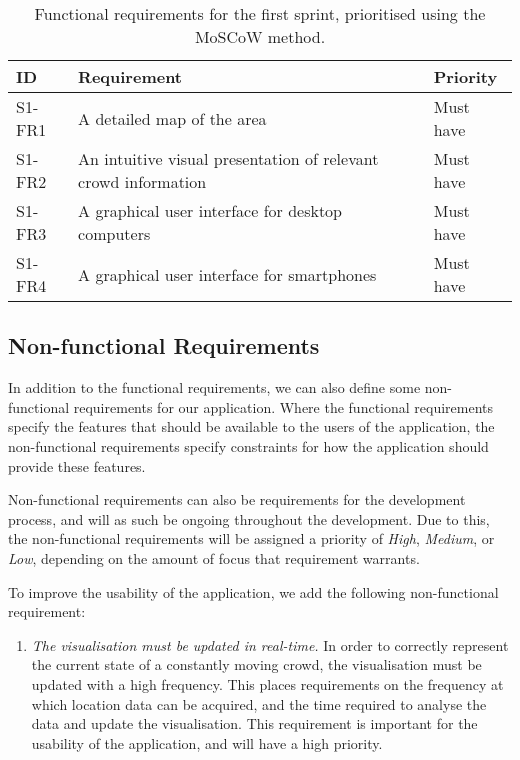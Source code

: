 \begin{table}[h!]
	\centering
	\begin{tabularx}{\textwidth}{lXl}
		\toprule
		\textbf{ID} & \textbf{Requirement} & \textbf{Priority} \\
		\midrule 
		\rowcolor[HTML]{EFEFEF} 
		S1-FR1 & A detailed map of the area & Must have \\
		S1-FR2 & An intuitive visual presentation of relevant crowd information & Must have \\
		\rowcolor[HTML]{EFEFEF} 
		S1-FR3 & A graphical user interface for desktop computers & Must have \\
		S1-FR4 & A graphical user interface for smartphones & Must have \\
		\bottomrule
	\end{tabularx}
	\caption{Functional requirements for the first sprint, prioritised using the MoSCoW method.}
	\label{tab:s1_req}
\end{table}

\subsection{Non-functional Requirements} \label{ss:s1_nfreqs}
In addition to the functional requirements, we can also define some non-functional requirements for our application. Where the functional requirements specify the features that should be available to the users of the application, the non-functional requirements specify constraints for how the application should provide these features. 

Non-functional requirements can also be requirements for the development process, and will as such be ongoing throughout the development. Due to this, the non-functional requirements will be assigned a priority of \emph{High}, \emph{Medium}, or \emph{Low}, depending on the amount of focus that requirement warrants. 

To improve the usability of the application, we add the following non-functional requirement:

\begin{enumerate}
    \item \emph{The visualisation must be updated in real-time.} In order to correctly represent the current state of a constantly moving crowd, the visualisation must be updated with a high frequency. This places requirements on the frequency at which location data can be acquired, and the time required to analyse the data and update the visualisation. This requirement is important for the usability of the application, and will have a high priority.
\end{enumerate}

